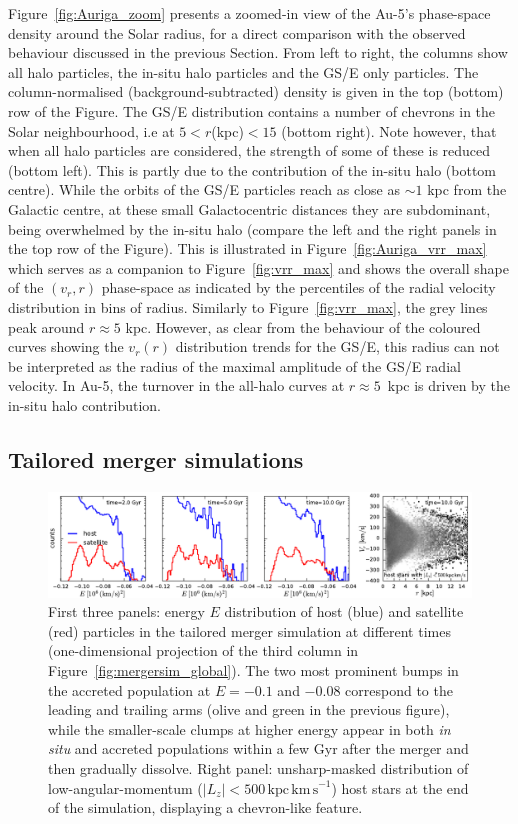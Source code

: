 \documentclass[a4paper,useAMS,usenatbib]{mnras}
\begin{document}
Figure~\ref{fig:Auriga_zoom} presents a zoomed-in view of the Au-5's phase-space density around the Solar radius, for a direct comparison with the observed behaviour discussed in the previous Section. From left to right, the columns show all halo particles, the in-situ halo particles and the GS/E only particles. The column-normalised (background-subtracted) density is given in the top (bottom) row of the Figure. The GS/E distribution contains a number of chevrons in the Solar neighbourhood, i.e at $5<r$(kpc)$<15$ (bottom right). Note however, that when all halo particles are considered, the strength of some of these is reduced (bottom left). This is partly due to the contribution of the in-situ halo (bottom centre). While the orbits of the GS/E particles reach as close as $\sim1$ kpc from the Galactic centre, at these small Galactocentric distances they are subdominant, being overwhelmed by the in-situ halo (compare the left and the right panels in the top row of the Figure). This is illustrated in Figure~\ref{fig:Auriga_vrr_max} which serves as a companion to Figure~\ref{fig:vrr_max} and shows the overall shape of the $(v_r,r)$ phase-space as indicated by the percentiles of the radial velocity distribution in bins of radius. Similarly to Figure~\ref{fig:vrr_max}, the grey lines peak around $r\approx5$ kpc. However, as clear from the behaviour of the coloured curves showing the $v_r(r)$ distribution trends for the GS/E, this radius can not be interpreted as the radius of the maximal amplitude of the GS/E radial velocity. In Au-5, the turnover in the all-halo curves at $r\approx5$~kpc is driven by the in-situ halo contribution.

\subsection{Tailored merger simulations}
\label{sec:mergersim}

\begin{figure}
  \centering
  \includegraphics{img/mergersim_insitu.pdf}
  \caption{
  First three panels: energy $E$ distribution of host (blue) and satellite (red) particles in the tailored merger simulation at different times (one-dimensional projection of the third column in Figure~\ref{fig:mergersim_global}). The two most prominent bumps in the accreted population at $E=-0.1$ and $-0.08$ correspond to the leading and trailing arms (olive and green in the previous figure), while the smaller-scale clumps at higher energy appear in both \textit{in situ} and accreted populations within a few Gyr after the merger and then gradually dissolve. Right panel: unsharp-masked distribution of low-angular-momentum ($|L_z| < 500\,\mathrm{kpc\,km\,s}^{-1}$) host stars at the end of the simulation, displaying a chevron-like feature.
  }
  \label{fig:mergersim_insitu}
\end{figure}
\end{document}
